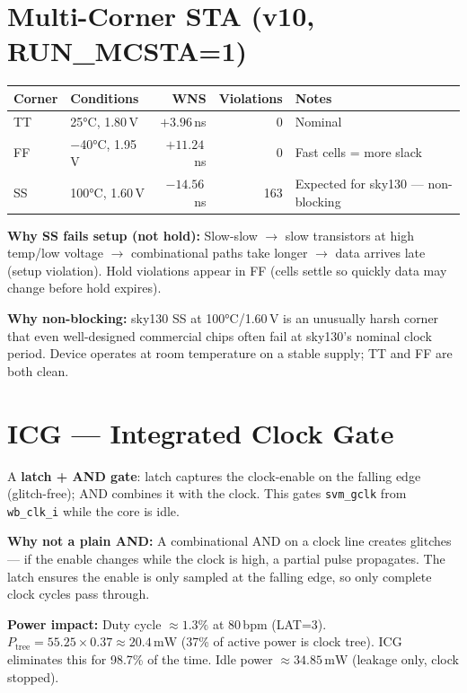 \documentclass[10pt]{article}
\begin{document}
\section{Multi-Corner STA (v10, RUN\_MCSTA=1)}

\begin{center}
\small
\begin{tabular}{llrrl}
\toprule
Corner & Conditions & WNS & Violations & Notes \\
\midrule
TT & 25°C, 1.80\,V & $+3.96$\,ns & 0 & Nominal \\
FF & $-$40°C, 1.95\,V & $+11.24$\,ns & 0 & Fast cells = more slack \\
SS & 100°C, 1.60\,V & $-14.56$\,ns & 163 & Expected for sky130 --- non-blocking \\
\bottomrule
\end{tabular}
\end{center}

\textbf{Why SS fails setup (not hold):} Slow-slow $\to$ slow transistors at high
temp/low voltage $\to$ combinational paths take longer $\to$ data arrives late
(setup violation). Hold violations appear in FF (cells settle so quickly data may
change before hold expires).

\textbf{Why non-blocking:} sky130 SS at 100°C/1.60\,V is an unusually harsh corner
that even well-designed commercial chips often fail at sky130's nominal clock period.
Device operates at room temperature on a stable supply; TT and FF are both clean.

\section{ICG --- Integrated Clock Gate}

A \textbf{latch + AND gate}: latch captures the clock-enable on the falling edge
(glitch-free); AND combines it with the clock. This gates \texttt{svm\_gclk}
from \texttt{wb\_clk\_i} while the core is idle.

\textbf{Why not a plain AND:} A combinational AND on a clock line creates glitches ---
if the enable changes while the clock is high, a partial pulse propagates.
The latch ensures the enable is only sampled at the falling edge, so only complete
clock cycles pass through.

\textbf{Power impact:} Duty cycle $\approx 1.3\%$ at 80\,bpm (LAT=3).
$P_{\text{tree}} = 55.25\times0.37 \approx 20.4\,\text{mW}$ (37\% of active power
is clock tree). ICG eliminates this for 98.7\% of the time.
Idle power $\approx 34.85\,\text{mW}$ (leakage only, clock stopped).
\end{document}
